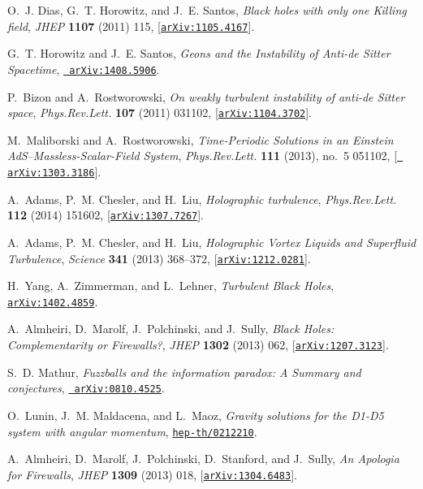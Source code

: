 \documentclass[12pt,a4paper]{article}
\begin{document}
\begin{thebibliography}{100}
O.~J. Dias, G.~T. Horowitz, and J.~E. Santos, {\it {Black holes with only one
  Killing field}},  {\em JHEP} {\bf 1107} (2011) 115,
  [\href{http://xxx.lanl.gov/abs/1105.4167}{{\tt arXiv:1105.4167}}].

G.~T. Horowitz and J.~E. Santos, {\it {Geons and the Instability of Anti-de
  Sitter Spacetime}},  \href{http://xxx.lanl.gov/abs/1408.5906}{{\tt
  arXiv:1408.5906}}.

P.~Bizon and A.~Rostworowski, {\it {On weakly turbulent instability of anti-de
  Sitter space}},  {\em Phys.Rev.Lett.} {\bf 107} (2011) 031102,
  [\href{http://xxx.lanl.gov/abs/1104.3702}{{\tt arXiv:1104.3702}}].

M.~Maliborski and A.~Rostworowski, {\it {Time-Periodic Solutions in an Einstein
  AdS--Massless-Scalar-Field System}},  {\em Phys.Rev.Lett.} {\bf 111} (2013),
  no.~5 051102, [\href{http://xxx.lanl.gov/abs/1303.3186}{{\tt
  arXiv:1303.3186}}].

A.~Adams, P.~M. Chesler, and H.~Liu, {\it {Holographic turbulence}},  {\em
  Phys.Rev.Lett.} {\bf 112} (2014) 151602,
  [\href{http://xxx.lanl.gov/abs/1307.7267}{{\tt arXiv:1307.7267}}].

A.~Adams, P.~M. Chesler, and H.~Liu, {\it {Holographic Vortex Liquids and
  Superfluid Turbulence}},  {\em Science} {\bf 341} (2013) 368--372,
  [\href{http://xxx.lanl.gov/abs/1212.0281}{{\tt arXiv:1212.0281}}].

H.~Yang, A.~Zimmerman, and L.~Lehner, {\it {Turbulent Black Holes}},
  \href{http://xxx.lanl.gov/abs/1402.4859}{{\tt arXiv:1402.4859}}.

A.~Almheiri, D.~Marolf, J.~Polchinski, and J.~Sully, {\it {Black Holes:
  Complementarity or Firewalls?}},  {\em JHEP} {\bf 1302} (2013) 062,
  [\href{http://xxx.lanl.gov/abs/1207.3123}{{\tt arXiv:1207.3123}}].

S.~D. Mathur, {\it {Fuzzballs and the information paradox: A Summary and
  conjectures}},  \href{http://xxx.lanl.gov/abs/0810.4525}{{\tt
  arXiv:0810.4525}}.

O.~Lunin, J.~M. Maldacena, and L.~Maoz, {\it {Gravity solutions for the D1-D5
  system with angular momentum}},
  \href{http://xxx.lanl.gov/abs/hep-th/0212210}{{\tt hep-th/0212210}}.

A.~Almheiri, D.~Marolf, J.~Polchinski, D.~Stanford, and J.~Sully, {\it {An
  Apologia for Firewalls}},  {\em JHEP} {\bf 1309} (2013) 018,
  [\href{http://xxx.lanl.gov/abs/1304.6483}{{\tt arXiv:1304.6483}}].


\end{thebibliography}
\end{document}
